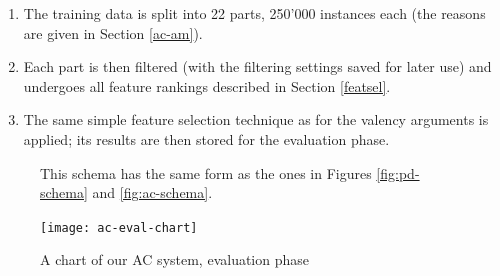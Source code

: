\documentclass[12pt,notitlepage]{report}
\begin{document}
\begin{enumerate}
    \begin{enumerate}
        \item The training data is split into 22 parts, 250'000 instances each (the reasons are given in Section \ref{ac-am}).
        \item Each part is then filtered (with the filtering settings saved for later use) and undergoes all feature rankings described in Section \ref{featsel}.
        \item The same simple feature selection technique as for the valency arguments is applied; its results are then stored for the evaluation phase.
    \end{enumerate}
\end{enumerate}

\begin{figure}[tb]
\caption{A chart of our AC system, evaluation phase}\label{fig:ac-eval}
\noindent\footnotesize This schema has the same form as the ones in Figures \ref{fig:pd-schema} and \ref{fig:ac-schema}.
\begin{center}
\texttt{[image: ac-eval-chart]}
\end{center}
\end{figure}
\end{document}
